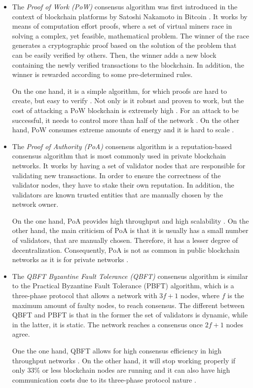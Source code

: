 \begin{itemize}
    \item The \textit{Proof of Work (PoW)} \cite{finney} consensus algorithm was first introduced in the context of blockchain platforms by Satoshi Nakamoto in Bitcoin \cite{nakamoto2009bitcoin}. It works by means of computation effort proofs, where a set of virtual miners race in solving a complex, yet feasible, mathematical problem. The winner of the race generates a cryptographic proof based on the solution of the problem that can be easily verified by others. Then, the winner adds a new block containing the newly verified transactions to the blockchain. In addition, the winner is rewarded according to some pre-determined rules.
    
    On the one hand, it is a simple algorithm, for which proofs are hard to create, but easy to verify \cite{li_blockchain_2021}. Not only is it robust and proven to work, but the cost of attacking a PoW blockchain is extremely high \cite{li_blockchain_2021}. For an attack to be successful, it needs to control more than half of the network \cite{li_blockchain_2021}. On the other hand, PoW consumes extreme amounts of energy and it is hard to scale \cite{edwood_2020, li_blockchain_2021, ccaf}.
    
    \item The \textit{Proof of Authority (PoA)} \cite{szilagyi_2017} consensus algorithm is a reputation-based consensus algorithm that is most commonly used in private blockchain networks. It works by having a set of validator nodes that are responsible for validating new transactions. In order to ensure the correctness of the validator nodes, they have to stake their own reputation. In addition, the validators are known trusted entities that are manually chosen by the network owner.
    
    On the one hand, PoA provides high throughput and high scalability \cite{bPoA}. On the other hand, the main criticism of PoA is that it is usually has a small number of validators, that are manually chosen. Therefore, it has a lesser degree of decentralization. Consequently, PoA is not as common in public blockchain networks as it is for private networks \cite{bPoA}.

    \item The \textit{QBFT Byzantine Fault Tolerance (QBFT)} \cite{10.48550/arxiv.2002.03613} consensus algorithm is similar to the Practical Byzantine Fault Tolerance (PBFT) \cite{Castro99practicalbyzantine} algorithm, which is a three-phase protocol that allows a network with $3f+1$ nodes, where $f$ is the maximum amount of faulty nodes, to reach consensus. The different between QBFT and PBFT is that in the former the set of validators is dynamic, while in the latter, it is static. The network reaches a consensus once $2f+1$ nodes agree.
    
    One the one hand, QBFT allows for high consensus efficiency in high throughput networks \cite{li_blockchain_2021}. On the other hand, it will stop working properly if only 33\% or less blockchain nodes are running and it can also have high communication costs due to its three-phase protocol nature \cite{li_blockchain_2021}.
\end{itemize}

